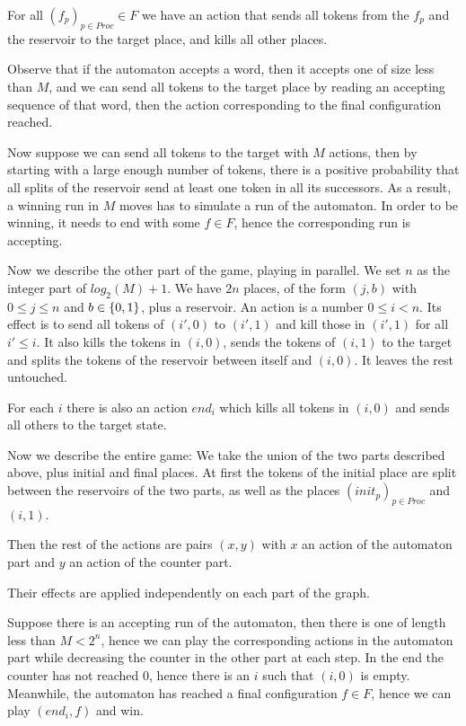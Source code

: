 \documentclass{article}
\begin{document}
For all $(f_p)_{p \in Proc} \in F$ we have an action that sends all tokens from the $f_p$ and the reservoir to the target place, and kills all other places. 

Observe that if the automaton accepts a word, then it accepts one of size less than $M$, and we can send all tokens to the target place by reading an accepting sequence of that word, then the action corresponding to the final configuration reached.  

Now suppose we can send all tokens to the target with $M$ actions, then by starting with a large enough number of tokens, there is a positive probability that all splits of the reservoir send at least one token in all its successors. As a result, a winning run in $M$ moves has to simulate a run of the automaton. 
In order to be winning, it needs to end with some $f \in F$, hence the corresponding run is accepting. 

Now we describe the other part of the game, playing in parallel.
We set $n$ as the integer part of $log_2(M)+1$. We have $2n$ places, of the form $(j,b)$ with $0 \leq j \leq  n$ and $b \in \{ 0,1 \}$, plus a reservoir.
An action is a number $0\leq i < n$. Its effect is to send all tokens of $(i', 0)$ to $(i', 1)$ and kill those in $(i',1)$ for all $i'\leq i$. It also kills the tokens in $(i,0)$, sends the tokens of $(i,1)$ to the target and splits the tokens of the reservoir between itself and $(i,0)$. It leaves the rest untouched.

For each $i$ there is also an action $end_i$ which kills all tokens in $(i,0)$ and sends all others to the target state.

Now we describe the entire game: We take the union of the two parts described above, plus initial and final places. At first the tokens of the initial place are split between the reservoirs of the two parts, as well as the places $(init_p)_{p \in Proc}$ and $(i,1)$.

Then the rest of the actions are pairs $(x,y)$ with $x$ an action of the automaton part and $y$ an action of the counter part.

Their effects are applied independently on each part of the graph.

Suppose there is an accepting run of the automaton, then there is one of length less than $M < 2^n$, hence we can play the corresponding actions in the automaton part while decreasing the counter in the other part at each step.
In the end the counter has not reached $0$, hence there is an $i$ such that $(i,0)$ is empty. Meanwhile, the automaton has reached a final configuration $f \in F$, hence we can play $(end_i, f)$ and win.
\end{document}
